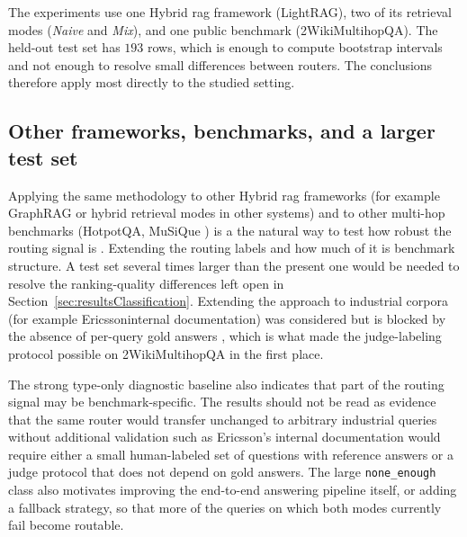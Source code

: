 \documentclass[english, bibtex]{kththesis}               %
\numberwithin{listing}{chapter}
\providecommand{\DIFaddtex}[1]{{\protect\color{blue} \sf #1}} %
\providecommand{\DIFdeltex}[1]{{\protect\color{red} \scriptsize #1}} %
\providecommand{\DIFaddbegin}{} %
\providecommand{\DIFaddend}{} %
\providecommand{\DIFdelbegin}{} %
\providecommand{\DIFdelend}{} %
\providecommand{\DIFadd}[1]{\texorpdfstring{\DIFaddtex{#1}}{#1}} %
\providecommand{\DIFdel}[1]{\texorpdfstring{\DIFdeltex{#1}}{}} %
\begin{document}
\DIFdelbegin %

\DIFdel{The experiments use one Hybrid \gls{rag} framework (LightRAG), two of its retrieval modes (\emph{Naive} and \emph{Mix}), and one public benchmark (2WikiMultihopQA). The held-out test set has $193$ rows, which is enough to compute bootstrap intervals and not enough to resolve small differences between routers. The conclusions therefore apply most directly to the studied setting. }\DIFdelend \DIFaddbegin \subsection{Other frameworks, benchmarks, and a larger test set} \DIFaddend Applying the same methodology to other Hybrid \gls{rag} frameworks (for example GraphRAG \cite{edge2024graphrag} or hybrid retrieval modes in other systems) and to other multi-hop benchmarks (HotpotQA, MuSiQue \cite{yang2018hotpotqa,trivedi2022musique}) is \DIFdelbegin \DIFdel{a }\DIFdelend \DIFaddbegin \DIFadd{the }\DIFaddend natural way to test how robust the routing signal is \DIFdelbegin \DIFdel{. Extending the routing labels }\DIFdelend \DIFaddbegin \DIFadd{and how much of it is benchmark structure. A test set several times larger than the present one would be needed to resolve the ranking-quality differences left open in Section~\ref{sec:resultsClassification}. Extending the approach }\DIFaddend to industrial corpora \DIFdelbegin \DIFdel{(for example Ericssoninternal documentation) was considered but is blocked by the absence of per-query gold answers , which is what made the judge-labeling protocol possible on 2WikiMultihopQA in the first place. }%

\DIFdel{The strong type-only diagnostic baseline also indicates that part of the routing signal may be benchmark-specific. The results should not be read as evidence that the same router would transfer unchanged to arbitrary industrial queries without additional validation}\DIFdelend \DIFaddbegin \DIFadd{such as Ericsson's internal documentation would require either a small human-labeled set of questions with reference answers or a judge protocol that does not depend on gold answers. The large \texttt{none\_enough} class also motivates improving the end-to-end answering pipeline itself, or adding a fallback strategy, so that more of the queries on which both modes currently fail become routable}\DIFaddend .
\end{document}

